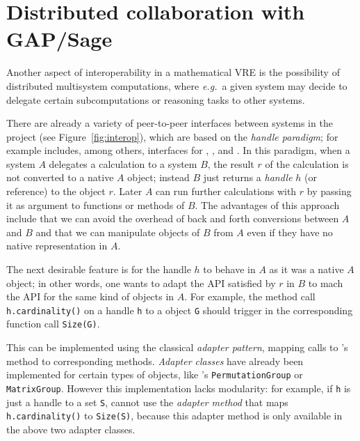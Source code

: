 \section{Distributed collaboration with GAP/Sage}\label{sec:gapsage}
\label{sec:handles}

Another aspect of interoperability in a mathematical VRE is the possibility of distributed
multisystem computations, where \emph{e.g.}\ a given system may decide to delegate
certain subcomputations or reasoning tasks to other systems.

There are already a variety of peer-to-peer interfaces between systems
in the \ODK project (see Figure~\ref{fig:interop}), which are based on
the \emph{handle paradigm}; for example \Sage includes, among others,
interfaces for \GAP, \Singular, and \Pari.
%
In this paradigm, when a system $A$ delegates a calculation to a system $B$, the
result $r$ of the calculation is not converted to a native $A$ object; instead $B$ just
returns a \emph{handle} $h$ (or reference) to the object $r$. Later $A$ can run further calculations
with $r$ by passing it as argument to functions or methods of $B$. The advantages of this
approach include that we can avoid the overhead of back and forth conversions between $A$
and $B$ and that we can manipulate objects of $B$ from $A$ even if they have no native
representation in $A$.

The next desirable feature is for the handle $h$ to behave in $A$ as
it was a native $A$ object; in other words, one wants to adapt the API
satisfied by $r$ in $B$ to mach the API for the same kind of objects
in $A$. For example, the method call \texttt{h.cardinality()} on a
\Sage handle \texttt{h} to a \GAP object \texttt{G} should trigger in
\GAP the corresponding function call \texttt{Size(G)}.

This can be implemented using the classical \emph{adapter
  pattern}, mapping calls to \Sage's method to corresponding \GAP
methods. \emph{Adapter classes} have already been implemented for
certain types of objects, like \Sage's \texttt{PermutationGroup} or
\texttt{MatrixGroup}. However this implementation lacks modularity:
for example, if \texttt{h} is just a handle to a set \texttt{S}, \Sage
cannot use the \emph{adapter method} that maps
\texttt{h.cardinality()} to \texttt{Size(S)}, because this adapter
method is only available in the above two adapter classes.

